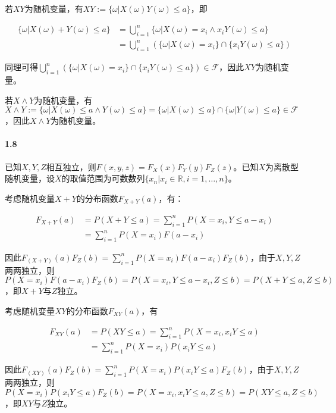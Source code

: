 \documentclass{article}
\begin{document}
    若$XY$为随机变量，有$XY:= \{\omega | X(\omega)Y(\omega) \leqslant a\}$，即

    \begin{equation}
        \begin{aligned}
            \{\omega | X(\omega) + Y(\omega) \leqslant a\} &= \bigcup_{i=1}^n\{\omega | X(\omega) = x_i \land  x_iY(\omega) \leqslant a\} \\
            &= \bigcup_{i=1}^n\left(\{\omega | X(\omega) = x_i\} \cap \{x_iY(\omega) \leqslant a\} \right)
        \end{aligned}
    \end{equation}

    同理可得$\bigcup_{i=1}^n\left(\{\omega | X(\omega) = x_i\} \cap \{x_iY(\omega) \leqslant a\} \right)\in \mathcal F$，因此$XY$为随机变量。

    若$X\land Y$为随机变量，有$X\land Y:= \{\omega | X(\omega)\leqslant a\land Y(\omega) \leqslant a\} = \{\omega | X(\omega)\leqslant a\}\cap \{\omega | Y(\omega) \leqslant a\}\in \mathcal F$，因此$X\land Y$为随机变量。

    \paragraph*{1.8} 已知$X, Y, Z$相互独立，则$F(x, y, z) = F_X(x)F_Y(y)F_Z(z)$。已知$X$为离散型随机变量，设$X$的取值范围为可数数列$\{x_n| x_i\in\mathbb R, i=1, \dots, n\}$。
    
    考虑随机变量$X + Y$的分布函数$F_{X+Y}(a)$，有：

    \begin{equation}
        \begin{aligned}
            F_{X+Y}(a) &= P(X + Y \leqslant a) = \sum_{i=1}^{n}P(X = x_i, Y \leqslant a - x_i) \\
            &= \sum_{i=1}^{n}P(X=x_i)F(a - x_i)
        \end{aligned}
    \end{equation}

    因此$F_(X + Y)(a)F_Z(b) = \sum_{i=1}^{n}P(X=x_i)F(a - x_i)F_Z(b)$，由于$X, Y, Z$两两独立，则$P(X=x_i)F(a - x_i)F_Z(b) = P(X=x_i, Y\leqslant a-x_i, Z\leqslant b) = P(X+Y\leqslant a, Z\leqslant b)$，即$X+Y$与$Z$独立。

    考虑随机变量$XY$的分布函数$F_{XY}(a)$，有

    \begin{equation}
        \begin{aligned}
            F_{XY}(a) &= P(XY \leqslant a) = \sum_{i=1}^{n}P(X = x_i, x_iY\leqslant a) \\
            &= \sum_{i=1}^nP(X=x_i)P(x_iY\leqslant a)
        \end{aligned}
    \end{equation}

    因此$F_(XY)(a)F_Z(b) = \sum_{i=1}^{n}P(X=x_i)P(x_iY\leqslant a)F_Z(b)$，由于$X, Y, Z$两两独立，则$P(X=x_i)P(x_iY\leqslant a)F_Z(b) = P(X=x_i, x_iY\leqslant a, Z\leqslant b) = P(XY\leqslant a, Z\leqslant b)$，即$XY$与$Z$独立。
\end{document}
